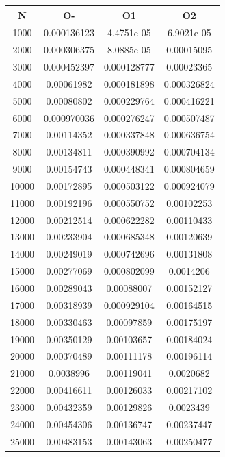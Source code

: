 \begin{center}
\begin{tabular}{| c | c | c | c |}
\hline
\textbf{N} & \textbf{O-} & \textbf{O1} & \textbf{O2} \\ \hline
1000 & 0.000136123 & 4.4751e-05 & 6.9021e-05 \\ \hline
2000 & 0.000306375 & 8.0885e-05 & 0.00015095 \\ \hline
3000 & 0.000452397 & 0.000128777 & 0.00023365 \\ \hline
4000 & 0.00061982 & 0.000181898 & 0.000326824 \\ \hline
5000 & 0.00080802 & 0.000229764 & 0.000416221 \\ \hline
6000 & 0.000970036 & 0.000276247 & 0.000507487 \\ \hline
7000 & 0.00114352 & 0.000337848 & 0.000636754 \\ \hline
8000 & 0.00134811 & 0.000390992 & 0.000704134 \\ \hline
9000 & 0.00154743 & 0.000448341 & 0.000804659 \\ \hline
10000 & 0.00172895 & 0.000503122 & 0.000924079 \\ \hline
11000 & 0.00192196 & 0.000550752 & 0.00102253 \\ \hline
12000 & 0.00212514 & 0.000622282 & 0.00110433 \\ \hline
13000 & 0.00233904 & 0.000685348 & 0.00120639 \\ \hline
14000 & 0.00249019 & 0.000742696 & 0.00131808 \\ \hline
15000 & 0.00277069 & 0.000802099 & 0.0014206 \\ \hline
16000 & 0.00289043 & 0.00088007 & 0.00152127 \\ \hline
17000 & 0.00318939 & 0.000929104 & 0.00164515 \\ \hline
18000 & 0.00330463 & 0.00097859 & 0.00175197 \\ \hline
19000 & 0.00350129 & 0.00103657 & 0.00184024 \\ \hline
20000 & 0.00370489 & 0.00111178 & 0.00196114 \\ \hline
21000 & 0.0038996 & 0.00119041 & 0.0020682 \\ \hline
22000 & 0.00416611 & 0.00126033 & 0.00217102 \\ \hline
23000 & 0.00432359 & 0.00129826 & 0.0023439 \\ \hline
24000 & 0.00454306 & 0.00136747 & 0.00237447 \\ \hline
25000 & 0.00483153 & 0.00143063 & 0.00250477 \\ \hline

\end{tabular}
\end{center}
